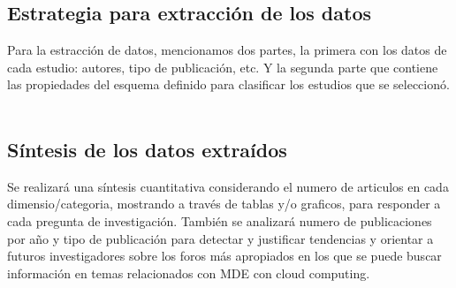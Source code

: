 \documentclass{llncs}
\begin{document}
\subsection{Estrategia para extracción de los datos}
Para la estracción de datos, mencionamos dos partes, la primera con los datos de cada estudio: autores, tipo de publicación, etc. Y la segunda parte que contiene las propiedades del esquema definido para clasificar los estudios que se seleccionó.\\ \\

\subsection{Síntesis de los datos extraídos}

Se realizará una síntesis cuantitativa considerando el numero de articulos en cada dimensio/categoria, mostrando a través de tablas y/o graficos, para responder a cada pregunta de investigación.
También se analizará numero de publicaciones por año y tipo de publicación para detectar y justificar tendencias y orientar a futuros investigadores sobre los foros más apropiados en los que se puede buscar información en temas relacionados con MDE con cloud computing.
\end{document}
